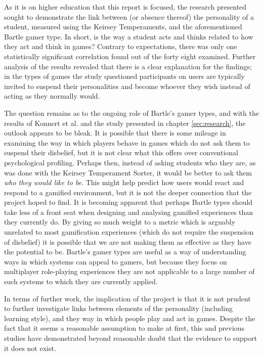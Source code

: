 \documentclass[12pt,a4paper,twoside]{report}
\begin{document}
As it is on higher education that this report is focused, the research presented sought to demonstrate the link between (or absence thereof) the personality of a student, measured using the Keirsey Temperaments, and the aforementioned Bartle gamer type. In short, is the way a student acts and thinks related to how they act and think in games? Contrary to expectations, there was only one statistically significant correlation found out of the forty eight examined. Further analysis of the results revealed that there is a clear explanation for the findings; in the types of games the study questioned participants on users are typically invited to suspend their personalities and become whoever they wish instead of acting as they normally would.

The question remains as to the ongoing role of Bartle's gamer types, and with the results of Konnert et al. \cite{konertmodeling} and the study presented in chapter \ref{sec:research}, the outlook appears to be bleak. It is possible that there is some mileage in examining the way in which players behave in games which do not ask them to suspend their disbelief, but it is not clear what this offers over conventional psychological profiling. Perhaps then, instead of asking students who they are, as was done with the Keirsey Temperament Sorter, it would be better to ask them \textit{who they would like to be}. This might help predict how users would react and respond to a gamified environment, but it is not the deeper connection that the project hoped to find. It is becoming apparent that perhaps Bartle types should take less of a front seat when designing and analysing gamified experiences than they currently do. By giving so much weight to a metric which is arguably unrelated to most gamification experiences (which do not require the suspension of disbelief) it is possible that we are not making them as effective as they have the potential to be. Bartle's gamer types are useful as a way of understanding ways in which systems can appeal to gamers, but because they focus on multiplayer role-playing experiences they are not applicable to a large number of such systems to which they are currently applied.

In terms of further work, the implication of the project is that it is not prudent to further investigate links between elements of the personality (including learning style), and they way in which people play and act in games. Despite the fact that it seems a reasonable assumption to make at first, this and previous studies have demonstrated beyond reasonable doubt that the evidence to support it does not exist.
\end{document}
